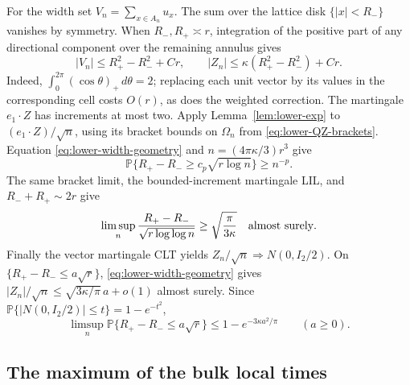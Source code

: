 For the width set $V_n=\sum_{x\in A_n}u_x$.
The sum over the lattice disk $\{|x|<R_-\}$ vanishes by symmetry.
When $R_-,R_+\asymp r$, integration of the positive part of any
directional component over the remaining annulus gives
\begin{equation}\label{eq:lower-width-geometry}
 |V_n|\leq R_+^2-R_-^2+Cr,
 \qquad |Z_n|\leq\kappa(R_+^2-R_-^2)+Cr.
\end{equation}
Indeed, $\int_0^{2\pi}(\cos\theta)_+\,d\theta=2$; replacing
each unit vector by its values in the corresponding cell costs
$O(r)$, as does the weighted correction.
The martingale $e_1\cdot Z$ has increments at most two.
Apply Lemma~\ref{lem:lower-exp} to $(e_1\cdot Z)/\sqrt n$,
using its bracket bounds on $\Omega_n$ from
\eqref{eq:lower-QZ-brackets}.  Equation
\eqref{eq:lower-width-geometry} and $n=(4\pi\kappa/3)r^3$ give
\begin{equation}\label{eq:lower-width-tail}
 \mathbb P\{R_+-R_-\geq c_p\sqrt{r\log n}\}\geq n^{-p}.
\end{equation}
The same bracket limit, the bounded-increment martingale LIL,
and $R_-+R_+\sim2r$ give
\begin{equation}\label{eq:lower-width-lil}
 \limsup_n\frac{R_+-R_-}{\sqrt{r\log\log n}}
       \geq\sqrt{\frac\pi{3\kappa}}\quad\hbox{almost surely}.
\end{equation}
Finally the vector martingale CLT yields
$Z_n/\sqrt n\Longrightarrow N(0,I_2/2)$.
On $\{R_+-R_-\leq a\sqrt r\}$,
\eqref{eq:lower-width-geometry} gives
$|Z_n|/\sqrt n\leq\sqrt{3\kappa/\pi}\,a+o(1)$ almost surely.
Since $\mathbb P\{|N(0,I_2/2)|\leq t\}=1-e^{-t^2}$,
\begin{equation}\label{eq:lower-width-small}
 \limsup_n\mathbb P\{R_+-R_-\leq a\sqrt r\}
       \leq1-e^{-3\kappa a^2/\pi}\qquad(a\geq0).
\end{equation}

\subsection{The maximum of the bulk local times}

